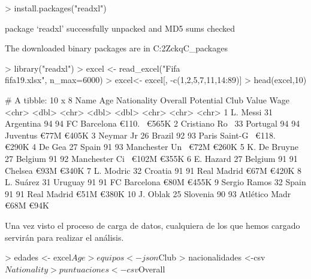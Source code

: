 \documentclass [a4paper] {article}
\begin{document}
\begin{Schunk}
\begin{Sinput}
> install.packages("readxl")
\end{Sinput}
\begin{Soutput}
package ‘readxl’ successfully unpacked and MD5 sums checked

The downloaded binary packages are in
	C:\Users\Cliri\AppData\Local\Temp\Rtmp2ZckqC\downloaded_packages
\end{Soutput}
\begin{Sinput}
> library("readxl")
> excel <- read_excel("Fifa\\fifa19.xlsx", n_max=6000)
> excel<- excel[, -c(1,2,5,7,11,14:89)]
> head(excel,10)
\end{Sinput}
\begin{Soutput}
# A tibble: 10 x 8
   Name            Age Nationality Overall Potential Club           Value  Wage 
   <chr>         <dbl> <chr>         <dbl>     <dbl> <chr>          <chr>  <chr>
 1 L. Messi         31 Argentina        94        94 FC Barcelona   €110.~ €565K
 2 Cristiano Ro~    33 Portugal         94        94 Juventus       €77M   €405K
 3 Neymar Jr        26 Brazil           92        93 Paris Saint-G~ €118.~ €290K
 4 De Gea           27 Spain            91        93 Manchester Un~ €72M   €260K
 5 K. De Bruyne     27 Belgium          91        92 Manchester Ci~ €102M  €355K
 6 E. Hazard        27 Belgium          91        91 Chelsea        €93M   €340K
 7 L. Modric        32 Croatia          91        91 Real Madrid    €67M   €420K
 8 L. Suárez        31 Uruguay          91        91 FC Barcelona   €80M   €455K
 9 Sergio Ramos     32 Spain            91        91 Real Madrid    €51M   €380K
10 J. Oblak         25 Slovenia         90        93 Atlético Madr~ €68M   €94K 
\end{Soutput}
\end{Schunk}

Una vez visto el proceso de carga de datos, cualquiera de los que hemos cargado servirán para realizar el análisis.

\begin{Schunk}
\begin{Sinput}
> edades <- excel$Age
> equipos <- json$Club
> nacionalidades <-csv$Nationality
> puntuaciones <- csv$Overall
\end{Sinput}
\end{Schunk}
\end{document}
